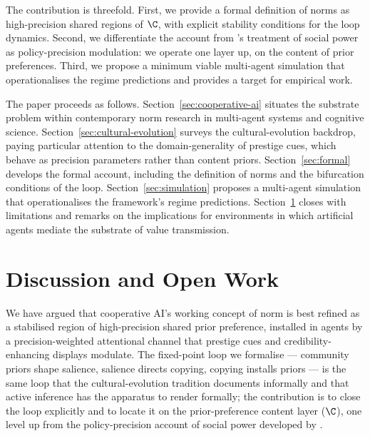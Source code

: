 \documentclass[11pt,a4paper]{article}
\begin{document}
The contribution is threefold. First, we provide a formal definition of
norms as high-precision shared regions of $\C$, with explicit stability
conditions for the loop dynamics. Second, we differentiate the account from
\citet{albarracin2025SocialPower}'s treatment of social power as
policy-precision modulation: we operate one layer up, on the content of
prior preferences. Third, we propose a minimum viable multi-agent simulation
that operationalises the regime predictions and provides a target for
empirical work.

The paper proceeds as follows. Section~\ref{sec:cooperative-ai} situates the
substrate problem within contemporary norm research in multi-agent systems
and cognitive science. Section~\ref{sec:cultural-evolution} surveys the
cultural-evolution backdrop, paying particular attention to the
domain-generality of prestige cues, which behave as precision parameters
rather than content priors. Section~\ref{sec:formal} develops the formal
account, including the definition of norms and the bifurcation conditions
of the loop. Section~\ref{sec:simulation} proposes a multi-agent simulation
that operationalises the framework's regime predictions.
Section~\ref{sec:discussion} closes with limitations and remarks on the
implications for environments in which artificial agents mediate the
substrate of value transmission.









\section{Discussion and Open Work}
\label{sec:discussion}

We have argued that cooperative AI's working concept of norm is best refined
as a stabilised region of high-precision shared prior preference, installed
in agents by a precision-weighted attentional channel that prestige cues and
credibility-enhancing displays modulate. The fixed-point loop we formalise
--- community priors shape salience, salience directs copying, copying
installs priors --- is the same loop that the cultural-evolution tradition
documents informally and that active inference has the apparatus to render
formally; the contribution is to close the loop explicitly and to locate it
on the prior-preference content layer ($\C$), one level up from the
policy-precision account of social power developed by
\citet{albarracin2025SocialPower}.
\end{document}
